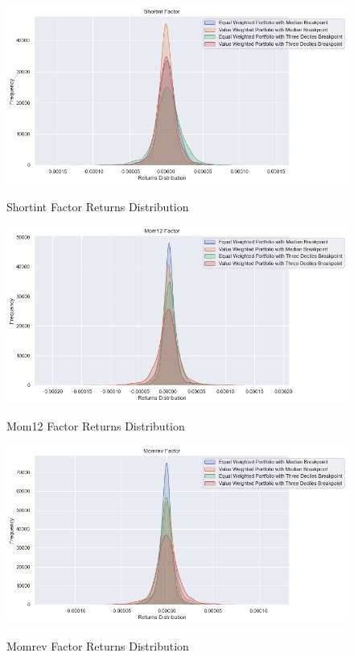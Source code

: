 \begin{figure}[H]
	\caption{Shortint Factor Returns Distribution}
	\centering
	\includegraphics[scale=.63]{../../output/figures/shortint.png}
	\label{fig:shortint}
\end{figure}

\begin{figure}[H]
	\caption{Mom12 Factor Returns Distribution}
	\centering
	\includegraphics[scale=.63]{../../output/figures/mom12.png}
	\label{fig:mom12}
\end{figure}

\begin{figure}[H]
	\caption{Momrev Factor Returns Distribution}
	\centering
	\includegraphics[scale=.63]{../../output/figures/momrev.png}
	\label{fig:momrev}
\end{figure}

